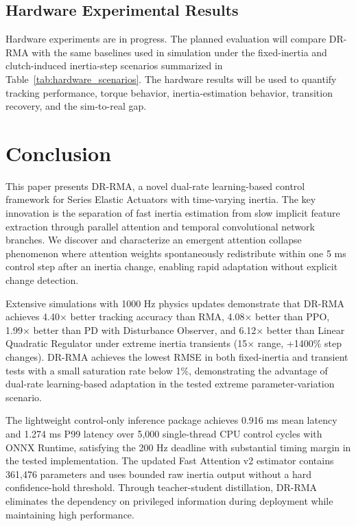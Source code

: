 \documentclass[lettersize,journal]{IEEEtran}
\begin{document}
\subsection{Hardware Experimental Results}

Hardware experiments are in progress. The planned evaluation will compare DR-RMA with the same baselines used in simulation under the fixed-inertia and clutch-induced inertia-step scenarios summarized in Table~\ref{tab:hardware_scenarios}. The hardware results will be used to quantify tracking performance, torque behavior, inertia-estimation behavior, transition recovery, and the sim-to-real gap.

\section{Conclusion}

This paper presents DR-RMA, a novel dual-rate learning-based control framework for Series Elastic Actuators with time-varying inertia. The key innovation is the separation of fast inertia estimation from slow implicit feature extraction through parallel attention and temporal convolutional network branches. We discover and characterize an emergent attention collapse phenomenon where attention weights spontaneously redistribute within one 5 ms control step after an inertia change, enabling rapid adaptation without explicit change detection.

Extensive simulations with 1000 Hz physics updates demonstrate that DR-RMA achieves 4.40× better tracking accuracy than RMA, 4.08× better than PPO, 1.99× better than PD with Disturbance Observer, and 6.12× better than Linear Quadratic Regulator under extreme inertia transients (15× range, +1400\% step changes). DR-RMA achieves the lowest RMSE in both fixed-inertia and transient tests with a small saturation rate below 1\%, demonstrating the advantage of dual-rate learning-based adaptation in the tested extreme parameter-variation scenario.

The lightweight control-only inference package achieves 0.916 ms mean latency and 1.274 ms P99 latency over 5,000 single-thread CPU control cycles with ONNX Runtime, satisfying the 200 Hz deadline with substantial timing margin in the tested implementation. The updated Fast Attention v2 estimator contains 361,476 parameters and uses bounded raw inertia output without a hard confidence-hold threshold. Through teacher-student distillation, DR-RMA eliminates the dependency on privileged information during deployment while maintaining high performance.
\end{document}
